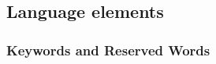 \subsection{Language elements}\label{section: ola-lang-language-elements}




\subsubsection{Keywords and Reserved Words}


